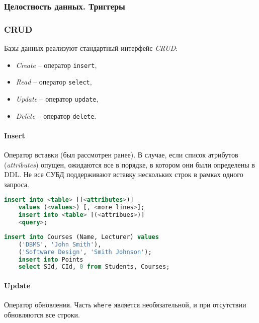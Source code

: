 \subsubsection{Целостность данных. Триггеры}

\subsubsection{CRUD}

Базы данных реализуют стандартный интерфейс \textit{CRUD}:

\begin{itemize}
	\item \textit{Create} -- оператор \texttt{insert},
	\item \textit{Read} -- оператор \texttt{select},
	\item \textit{Update} -- оператор \texttt{update},
	\item \textit{Delete} -- оператор \texttt{delete}.
\end{itemize}

\paragraph{Insert}

Оператор вставки (был рассмотрен ранее). В случае, если список атрибутов (\textit{attributes})
опущен, ожидаются все в порядке, в котором они были определены в DDL. Не все СУБД поддерживают
вставку нескольких строк в рамках одного запроса.

\begin{lstlisting}[language=SQL]
    insert into <table> [(<attributes>)]
    values (<values>) [, <more lines>];
    insert into <table> [(<attribues>)]
    <query>;
\end{lstlisting}

\begin{examples}
	\enewline
	\begin{lstlisting}[language=SQL]
    insert into Courses (Name, Lecturer) values
    ('DBMS', 'John Smith'),
    ('Software Design', 'Smith Johnson');
    insert into Points
    select SId, CId, 0 from Students, Courses;
    \end{lstlisting}
\end{examples}

\paragraph{Update}

Оператор обновления. Часть \texttt{where} является необязательной, и при отсутствии
обновляются все строки.

